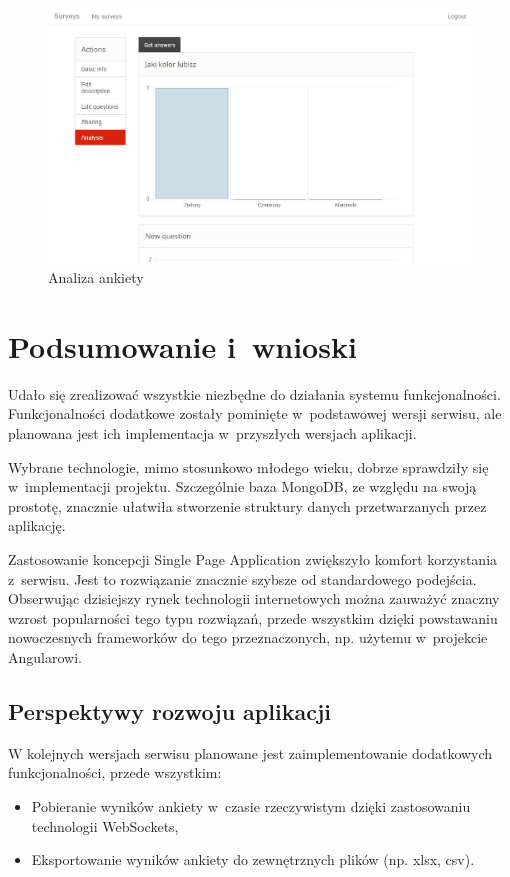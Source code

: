 \documentclass[12pt,a4paper,notitlepage]{article}
\begin{document}
\begin{figure}[H]
    \centering
    \includegraphics[width=\linewidth]{obrazy/analysis}
    \caption{Analiza ankiety}
\end{figure}

\newpage
\section{Podsumowanie i~wnioski}
Udało się zrealizować wszystkie niezbędne do działania systemu funkcjonalności. Funkcjonalności dodatkowe zostały pominięte w~podstawowej wersji serwisu, ale planowana jest ich implementacja w~przyszłych wersjach aplikacji.
\par Wybrane technologie, mimo stosunkowo młodego wieku, dobrze sprawdziły się w~implementacji projektu. Szczególnie baza MongoDB, ze względu na swoją prostotę, znacznie ułatwiła stworzenie struktury danych przetwarzanych przez aplikację. 
\par Zastosowanie koncepcji Single Page Application zwiększyło komfort korzystania z~serwisu. Jest to rozwiązanie znacznie szybsze od standardowego podejścia. Obserwując dzisiejszy rynek technologii internetowych można zauważyć znaczny wzrost popularności tego typu rozwiązań, przede wszystkim dzięki powstawaniu nowoczesnych frameworków do tego przeznaczonych, np. użytemu w~projekcie Angularowi.

\subsection{Perspektywy rozwoju aplikacji}
W kolejnych wersjach serwisu planowane jest zaimplementowanie dodatkowych funkcjonalności, przede wszystkim:
\begin{itemize}
\item Pobieranie wyników ankiety w~czasie rzeczywistym dzięki zastosowaniu technologii WebSockets,
\item Eksportowanie wyników ankiety do zewnętrznych plików (np. xlsx, csv).
\end{itemize}
\end{document}
